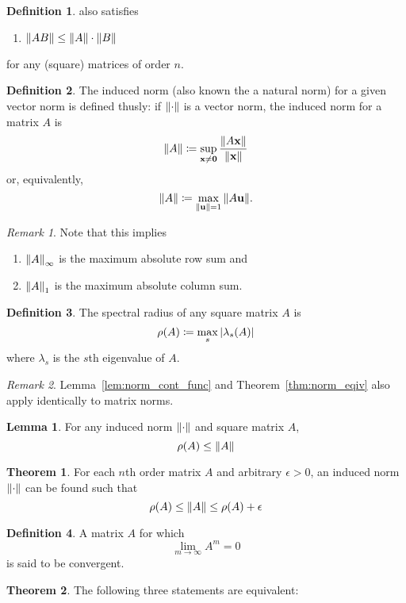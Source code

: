 \documentclass[11pt,letterpaper]{article}
\numberwithin{figure}{section} %
\newcommand{\keyword}[1]{\colorbox{cyan!20!}{#1}}
\theoremstyle{definition}
\newtheorem{theorem}{Theorem}[subsection]
\theoremstyle{definition}
\newtheorem{lemma}{Lemma}[subsection]
\theoremstyle{definition}
\newtheorem{definition}{Definition}[subsection]
\theoremstyle{definition}
\theoremstyle{remark}
\newtheorem*{remark}{Remark}
\theoremstyle{remark}
\theoremstyle{definition}
\theoremstyle{remark}
\theoremstyle{remark}
\begin{document}
\begin{multicols*}{3}
\begin{definition}
	also satisfies 
	\begin{enumerate}[label={(\roman*)}, start=4]
		\item $\norm{AB} \leq \norm{A} \cdot \norm{B}$
	\end{enumerate}
	for any (square) matrices of order $n$.
\end{definition}
\begin{definition}
	The \keyword{induced norm} (also known the a natural norm) for a given vector
	norm is defined thusly: if $\norm{\cdot}$ is a vector norm, the induced norm
	for a matrix $A$ is
	\[
		\norm{A} \coloneqq \sup_{\vb{x}\neq \vb{0}} \frac{\norm{A\vb{x}}}{\norm{\vb{x}}}
	\]
	or, equivalently,
	\[
		\norm{A} \coloneqq \max_{\norm{\vb{u}}=1} \norm{A\vb{u}}.
	\]
\end{definition}
\begin{remark}
	Note that this implies 
	\begin{enumerate}[label={(\Alph*)}]
		\item $\norm{A}_\infty$ is the maximum absolute row sum and
		\item $\norm{A}_1$ is the maximum absolute column sum.
	\end{enumerate}
\end{remark}
\begin{definition}
	The \keyword{spectral radius} of any square matrix $A$ is
	\[
		\rho(A) \coloneqq \max_s \abs{\lambda_s(A)}
	\]
	where $\lambda_s$ is the $s$th eigenvalue of $A$.
\end{definition}
\begin{remark}
	Lemma~\ref{lem:norm_cont_func} and Theorem~\ref{thm:norm_eqiv} also apply
	identically to matrix norms.
\end{remark}
\begin{lemma}
	For any induced norm $\norm{\cdot}$ and square matrix $A$, 
	\[
		\rho(A) \leq \norm{A}
	\]
\end{lemma}
\begin{theorem}
	For each $n$th order matrix $A$ and arbitrary $\epsilon > 0$, an induced norm
	$\norm{\cdot}$ can be found such that
	\[
		\rho(A) \leq \norm{A} \leq \rho(A) + \epsilon
	\]
\end{theorem}
\begin{definition}
	A matrix $A$ for which
	\[
		\lim_{m\to\infty} A^m = 0
	\]
	is said to be \keyword{convergent}.
\end{definition}
\begin{theorem}
	The following three statements are equivalent:
	\begin{enumerate}[label={(\alph*)}]

\end{enumerate}
\end{theorem}
\end{multicols*}
\end{document}
